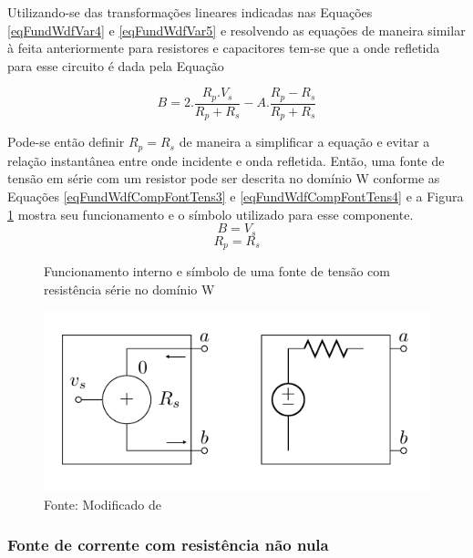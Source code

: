 	Utilizando-se das transformações lineares indicadas nas Equações \ref{eqFundWdfVar4} e \ref{eqFundWdfVar5} e resolvendo as equações de maneira similar à feita anteriormente para resistores e capacitores tem-se que a onde refletida para esse circuito é dada pela Equação 
	
	\begin{equation}
		\label{eqFundWdfCompFontTens2}
		B = 2.\frac{R_p.V_s}{R_p+R_s}-A.\frac{R_p-R_s}{R_p+R_s}
	\end{equation}
	
	Pode-se então definir $R_p = R_s$ de maneira a simplificar a equação e evitar a relação instantânea entre onde incidente e onda refletida. Então, uma fonte de tensão em série com um resistor pode ser descrita no domínio W conforme as Equações \ref{eqFundWdfCompFontTens3} e \ref{eqFundWdfCompFontTens4} e a Figura \ref{figFundWdfCompFontTens2} mostra seu funcionamento e o símbolo utilizado para esse componente.
	\begin{equation}
		\label{eqFundWdfCompFontTens3}
		B = V_s
	\end{equation}
	\begin{equation}
		\label{eqFundWdfCompFontTens4}
		R_p = R_s
	\end{equation}
	
	\begin{figure}[h]
		\label{figFundWdfCompFontTens2}
		\caption{Funcionamento interno e símbolo de uma fonte de tensão com resistência série no domínio W}
		\includegraphics[scale=0.5]{images/fonteTensaoDominioW}
		\centering
		\caption*{Fonte: Modificado de \cite{Bogason2017}}
	\end{figure}
	
		\subsubsection{Fonte de corrente com resistência não nula}
	
